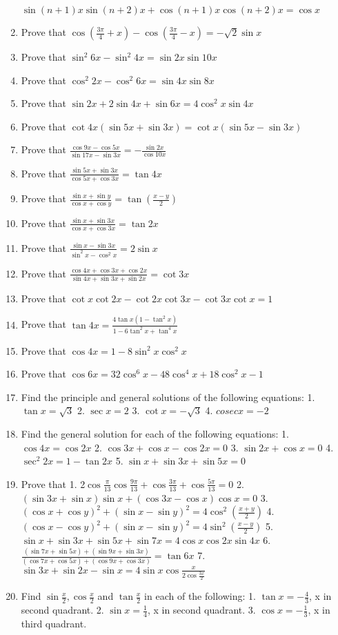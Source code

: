 \begin{enumerate}[label=\thesubsection.\arabic*.,ref=\thesubsection.\theenumi,itemsep=1ex]
$\sin(n+1)x\sin(n+2)x+\cos(n+1)x\cos(n+2)x=\cos x$
%
\item Prove that
$\cos(\frac{3\pi}{4}+x)-\cos(\frac{3\pi}{4}-x)=-\sqrt 2\sin x $
%
\item Prove that
$\sin^{2}6x-\sin^{2}4x=\sin2x\sin10x$
%
\item Prove that
$\cos^{2}2x-\cos^{2}6x=\sin4x\sin8x$
%
\item Prove that
$\sin2x+2\sin4x+\sin6x=4\cos^{2}x\sin4x$
%
\item Prove that
$\cot4x(\sin5x+\sin3x)= \cot x(\sin5x-\sin3x)$
%
\item Prove that
$\frac{\cos9x-\cos5x}{\sin17x-\sin3x}=-\frac{\sin2x}{\cos10x}$
%
\item Prove that
$\frac{\sin5x+\sin3x}{\cos5x+\cos3x}=\tan4x$
%
\item Prove that
$\frac{\sin x+\sin y}{\cos x+\cos y}=\tan(\frac{x-y}{2})$
%
\item Prove that
$\frac{\sin x+\sin3x}{\cos x+\cos3x}=\tan2x$
%
\item Prove that
$\frac{\sin x-\sin3x}{\sin^{2}x-\cos^{2}x}=2\sin x$
%
\item Prove that
$\frac{\cos4x+\cos3x+\cos2x}{\sin4x+\sin3x+\sin2x}=\cot3x$
%
\item Prove that
$\cot x\cot2x-\cot2x\cot3x-\cot3x\cot x=1$
%
\item Prove that
$\tan4x=\frac{4\tan x(1-\tan^{2}x)}{1-6\tan^{2}x+\tan^{4}x}$
%
\item Prove that
$\cos4x=1-8\sin^{2}x\cos^{2}x$
%
\item Prove that
$\cos6x=32\cos^{6}x-48\cos^{4}x+18\cos^{2}x-1$
%
\item Find the principle and general solutions of the following equations:
1. $\tan x=\sqrt 3$
2. $\sec x=2$
3. $\cot x=-\sqrt 3$
4. $cosec x=-2$
%
\item Find the general solution for each of the following equations:
1. $\cos4x=\cos2x$
2. $\cos3x+\cos x-\cos2x=0$
3. $\sin2x+\cos x=0$
4. $\sec^{2}2x=1-\tan2x$
5. $\sin x+\sin3x+\sin5x=0$
%
\item Prove that
1. 2$\cos\frac{\pi}{13}\cos\frac{9\pi}{13}+\cos\frac{3\pi}{13}+\cos\frac{5\pi}{13}=0$
2. $(\sin3x+\sin x)\sin x+(\cos3x-\cos x)\cos x=0$
3. $(\cos x+\cos y)^{2}+(\sin x-\sin y)^{2}=4\cos^{2}(\frac{x+y}{2})$
4. $(\cos x-\cos y)^{2}+(\sin x-\sin y)^{2}=4\sin^{2}(\frac{x-y}{2})$
5. $\sin x+\sin3x+\sin5x+\sin7x=4\cos x\cos2x\sin4x$
6. $\frac{(\sin7x+\sin5x)+(\sin9x+\sin3x)}{(\cos7x+\cos5x)+(\cos9x+\cos3x)}=\tan6x$
7. $\sin3x+\sin2x-\sin x=4\sin x\cos\frac{x}{2\cos\frac{3x}{2}}$
%
\item Find $\sin\frac{x}{2},\cos\frac{x}{2}$ and $\tan\frac{x}{2}$ in each of the following:
1. $\tan x=-\frac{4}{3}$, x in second quadrant. 
2. $\sin x=\frac{1}{4}$, x in second quadrant.
3. $\cos x=-\frac{1}{3}$, x in third quadrant.
    
\end{enumerate}
    
